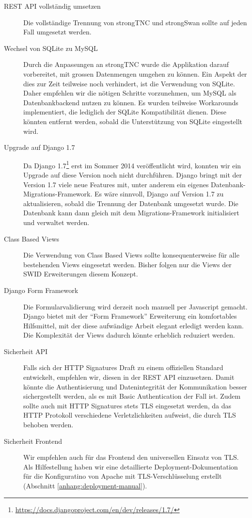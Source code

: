 \begin{description} 

	\item[REST API vollständig umsetzen] Die vollständige Trennung von strongTNC
	und strongSwan sollte auf jeden Fall umgesetzt werden.
	
	\item[Wechsel von SQLite zu MySQL] Durch die Anpassungen an strongTNC
	wurde die Applikation darauf vorbereitet, mit grossen Datenmengen umgehen zu
	können. Ein Aspekt der dies zur Zeit teilweise noch verhindert, ist die
	Verwendung von SQLite. Daher empfehlen wir die nötigen Schritte vorzunehmen, um
	MySQL als Datenbankbackend nutzen zu können. Es wurden teilweise Workarounds
	implementiert, die lediglich der SQLite Kompatibilität dienen. Diese könnten
	entfernt werden, sobald die Unterstützung von SQLite eingestellt wird.

	\item[Upgrade auf Django 1.7] Da Django
	1.7\footnote{\url{https://docs.djangoproject.com/en/dev/releases/1.7/}} erst
	im Sommer 2014 veröffentlicht wird, konnten wir ein Upgrade auf diese
	Version noch nicht durchführen. Django bringt mit der Version 1.7 viele neue
	Features mit, unter anderem ein eigenes Datenbank-Migrations-Framework. Es
	wäre sinnvoll, Django auf Version 1.7 zu aktualisieren, sobald die Trennung
	der Datenbank umgesetzt wurde. Die Datenbank kann dann gleich mit dem
	Migrations-Framework initialisiert und verwaltet werden.
	
	\item[Class Based Views] Die Verwendung von Class Based Views sollte
	konsequenterweise für alle bestehenden Views eingesetzt werden. Bisher folgen
	nur die Views der SWID Erweiterungen diesem Konzept.
	
	\item[Django Form Framework] Die Formularvalidierung wird derzeit noch manuell
	per Javascript gemacht. Django bietet mit der \enquote{Form Framework}
	Erweiterung ein komfortables Hilfsmittel, mit der diese aufwändige Arbeit
	elegant erledigt werden kann. Die Komplexität der Views dadurch könnte
	erheblich reduziert werden.
	
	\item[Sicherheit API] Falls sich der HTTP Signatures Draft zu einem offiziellen Standard entwickelt, empfehlen wir, diesen in der REST API einzusetzen. Damit könnte die Authentisierung und Datenintegrität der Kommunikation besser sichergestellt werden, als es mit Basic Authentication der Fall ist.
	Zudem sollte auch mit HTTP Signatures stets TLS eingesetzt werden, da das HTTP Protokoll verschiedene Verletzlichkeiten aufweist, die durch TLS
	behoben werden\cite{httpsecconsiderations2014}.
	
	\item[Sicherheit Frontend]
	Wir empfehlen auch für das Frontend den universellen Einsatz von TLS. Als Hilfestellung haben wir eine detaillierte Deployment-Dokumentation für die Konfiguratino von Apache mit TLS-Verschlüsselung erstellt (Abschnitt \ref{anhang:deployment-manual}).
	
\end{description}
